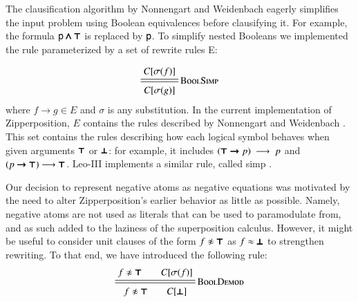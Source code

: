 The clausification algorithm by Nonnengart and Weidenbach \cite{nw-01-small-cnf}
eagerly simplifies the input problem using Boolean equivalences before clausifying it. For example,
the formula $\mathsf{p}\pmb{\land}\pmb{\top}$ is replaced by $\mathsf{p}$. To simplify nested Booleans we implemented the rule 
parameterized by a set of rewrite rules E:

\[
\namedsimp{BoolSimp}{C[\sigmaterm{f}]}{C[\sigmaterm{g}]}
\]
where $f \longrightarrow g \in E$ and $\sigma$ is any substitution. In the current implementation of Zipperposition, $E$ contains the rules
described by Nonnengart and Weidenbach \cite[Sect.~3]{nw-01-small-cnf}. This set contains
the rules describing how each logical symbol behaves when given arguments $\pmb{\top}$ or $\pmb{\bot}$: for example, 
it includes $(\pmb{\top} \pmb{\rightarrow} p)~\longrightarrow~p $ and $(p \pmb{\rightarrow} \pmb{\top}) \longrightarrow \pmb{\top}$. %
Leo-III implements a similar rule, called \textsf{simp} \cite[Sect.~4.2.1.]{as-18-phd}.


Our decision to represent negative atoms as negative equations was motivated by
the need to alter Zipperposition's earlier behavior as little as possible. 
Namely, negative atoms are not used as literals that can be used
to paramodulate from, and as such added to the laziness of the superposition calculus.
However, it might be useful to consider unit clauses of the form $f \noteq \itrue$
as $f \approx \pmb{\bot}$ to strengthen rewriting. To that end, we have introduced the following
rule:
%
$$ \namedsimp{BoolDemod}{f \noteq \itrue \qquad C[\sigmaterm{f}]}{f \noteq \itrue \qquad C[\ifalse]} $$

